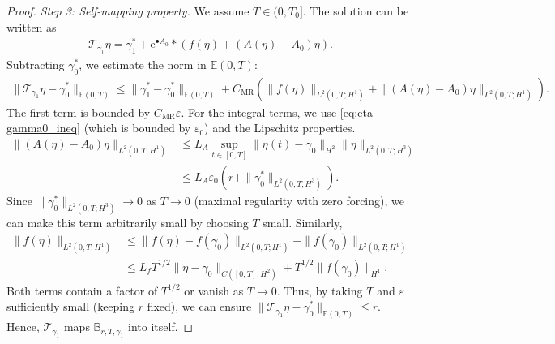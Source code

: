 \documentclass{article}
\theoremstyle{remark}
\theoremstyle{definition}
\numberwithin{equation}{section}
\begin{document}
\begin{proof}
    \textit{Step 3: Self-mapping property.}
    We assume $T \in (0, T_0]$. The solution can be written as
    \begin{align*}
        \mathcal{T}_{\gamma_1}\eta = \gamma_1^\ast + \mathrm{e}^{\bullet A_0} \ast \left( f(\eta) + (A(\eta) - A_0)\eta \right).
    \end{align*}
    Subtracting $\gamma_0^\ast$, we estimate the norm in $\mathbb{E}(0,T)$:
    \begin{align*}
        \|\mathcal{T}_{\gamma_1}\eta - \gamma_0^\ast\|_{\mathbb{E}(0,T)}
        \le \|\gamma_1^\ast - \gamma_0^\ast\|_{\mathbb{E}(0,T)} + C_{\mathrm{MR}} \left( \|f(\eta)\|_{L^2(0,T;H^1)} + \|(A(\eta) - A_0)\eta\|_{L^2(0,T;H^1)} \right).
    \end{align*}
    The first term is bounded by $C_{\mathrm{MR}}\varepsilon$.
    For the integral terms, we use \eqref{eq:eta-gamma0_ineq} (which is bounded by $\varepsilon_0$) and the Lipschitz properties.
    \begin{align*}
        \|(A(\eta) - A_0)\eta\|_{L^2(0,T;H^1)} 
        &\le L_A \sup_{t \in [0,T]} \|\eta(t) - \gamma_0\|_{H^2} \|\eta\|_{L^2(0,T;H^3)} \\
        &\le L_A \varepsilon_0 \left( r + \|\gamma_0^\ast\|_{L^2(0,T;H^3)} \right).
    \end{align*}
    Since $\|\gamma_0^\ast\|_{L^2(0,T;H^3)} \to 0$ as $T \to 0$ (maximal regularity with zero forcing), we can make this term arbitrarily small by choosing $T$ small.
    Similarly,
    \begin{align*}
        \|f(\eta)\|_{L^2(0,T;H^1)} 
        &\le \|f(\eta) - f(\gamma_0)\|_{L^2(0,T;H^1)} + \|f(\gamma_0)\|_{L^2(0,T;H^1)} \\
        &\le L_f T^{1/2} \|\eta - \gamma_0\|_{C([0,T];H^2)} + T^{1/2} \|f(\gamma_0)\|_{H^1}.
    \end{align*}
    Both terms contain a factor of $T^{1/2}$ or vanish as $T \to 0$.
    Thus, by taking $T$ and $\varepsilon$ sufficiently small (keeping $r$ fixed), we can ensure $\|\mathcal{T}_{\gamma_1}\eta - \gamma_0^\ast\|_{\mathbb{E}(0,T)} \le r$.
    Hence, $\mathcal{T}_{\gamma_1}$ maps $\mathbb{B}_{r,T,\gamma_1}$ into itself.


\end{proof}
\end{document}
